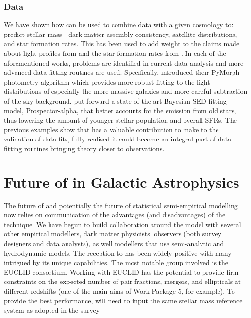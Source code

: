 \subsubsection{Data}

We have shown how \steel can be used to combine data with a given cosmology to: predict stellar-mass - dark matter assembly consistency, satellite distributions, and star formation rates. This has been used to add weight to the claims made about light profiles from \citet{Bernardi2017ComparingLight} and the star formation rates from \citet{Leja2019AnSurvey}. In each of the aforementioned works, problems are identified in current data analysis and more advanced data fitting routines are used. Specifically, \citet{Bernardi2017ComparingLight}  introduced their PyMorph photometry algorithm which provides more robust fitting to the light distributions of especially the more massive galaxies and more careful subtraction of the sky background. \citet{Leja2019AnSurvey} put forward a state-of-the-art Bayesian SED fitting model, Prospector-alpha, that better accounts for the emission from old stars, thus lowering the amount of younger stellar population and overall SFRs. The previous examples show that \steel has a valuable contribution to make to the validation of data fits, fully realised it could become an integral part of data fitting routines bringing theory closer to observations.

\section{Future of \steel in Galactic Astrophysics}
\label{sec:Future}

The future of \steel and potentially the future of statistical semi-empirical modelling now relies on communication of the advantages (and disadvantages) of the technique. We have begun to build collaboration around the model with several other empirical modellers, dark matter physicists, observers (both survey designers and data analysts), as well modellers that use semi-analytic and hydrodynamic models. The reception to \steel has been widely positive with many intrigued by its unique capabilities. The most notable group involved is the EUCLID consortium. Working with EUCLID \steel has the potential to provide firm constraints on the expected number of pair fractions, mergers, and ellipticals at different redshifts (one of the main aims of Work Package 5, for example). To provide the best performance, \steel will need to input the same stellar mass reference system as adopted in the survey.

